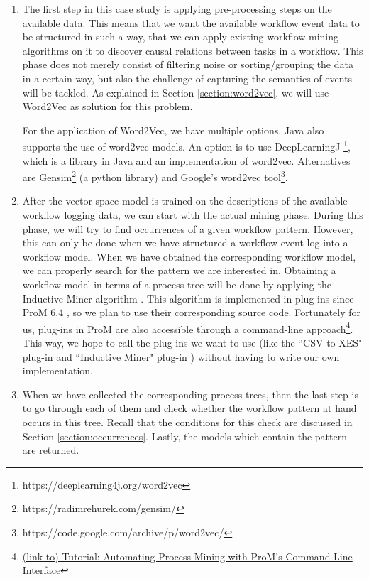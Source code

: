 \documentclass[a4paper,11pt]{article}
\begin{document}
\begin{enumerate}
\item The first step in this case study is applying pre-processing steps on the available data. This means that we want the available workflow event data to be structured in such a way, that we can apply existing workflow mining algorithms on it to discover causal relations between tasks in a workflow. This phase does not merely consist of filtering noise or sorting/grouping the data in a certain way, but also the challenge of capturing the semantics of events will be tackled. As explained in Section \ref{section:word2vec}, we will use Word2Vec \cite{Mikolov2013aWord2Vec,Mikolov2013bWord2Vec} as solution for this problem.

For the application of Word2Vec, we have multiple options. Java also supports the use of word2vec models. An option is to use DeepLearningJ \footnote{https://deeplearning4j.org/word2vec}, which is a library in Java and an implementation of word2vec. Alternatives are Gensim\footnote{https://radimrehurek.com/gensim/} (a python library) and Google's word2vec tool\footnote{https://code.google.com/archive/p/word2vec/}. 
\item After the vector space model is trained on the descriptions of the available workflow logging data, we can start with the actual mining phase. During this phase, we will try to find occurrences of a given workflow pattern. However, this can only be done when we have structured a workflow event log into a workflow model. When we have obtained the corresponding workflow model, we can properly search for the pattern we are interested in. Obtaining a workflow model in terms of a process tree will be done by applying the Inductive Miner algorithm \cite{InductiveMiner2013}. This algorithm is implemented in plug-ins since ProM 6.4 \cite{InductiveVisualMiner2014}, so we plan to use their corresponding source code. Fortunately for us, plug-ins in ProM are also accessible through a command-line approach\footnote{\href{https://dirksmetric.wordpress.com/2015/03/11/tutorial-automating-process-mining-with-proms-command-line-interface/}{(link to) Tutorial: Automating Process Mining with ProM’s Command Line Interface}}. This way, we hope to call the plug-ins we want to use (like the ``CSV to XES" plug-in \cite{XES2011Verbeek} and ``Inductive Miner" plug-in \cite{InductiveMiner2013}) without having to write our own implementation.
\item When we have collected the corresponding process trees, then the last step is to go through each of them and check whether the workflow pattern at hand occurs in this tree. Recall that the conditions for this check are discussed in Section \ref{section:occurrences}. Lastly, the models which contain the pattern are returned. 
\end{enumerate}
\end{document}

